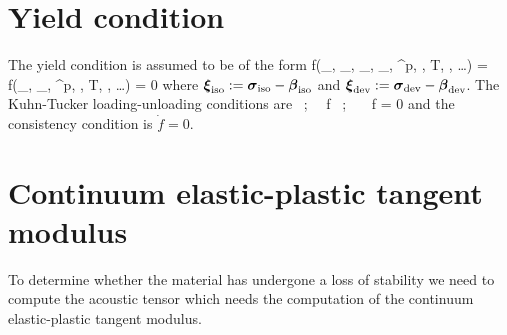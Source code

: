 \section{Yield condition}
The yield condition is assumed to be of the form
\Beq
  f(\Bsig_\Tiso, \Bsig_\Tdev, \Bbeta_\Tiso, \Bbeta_\Tdev, \Ve^p, \phi, T, \dot{\Ve}, \dots) 
    = f(\Bxi_\Tiso, \Bxi_\Tdev, \Ve^p, \phi, T, \dot{\Ve}, \dots) = 0
\Eeq
where $\boldsymbol{\xi}_{\text{iso}} := \boldsymbol{\sigma}_{\text{iso}} - \boldsymbol{\beta}_{\text{iso}}$ and $\boldsymbol{\xi}_{\text{dev}} := \boldsymbol{\sigma}_{\text{dev}} - \boldsymbol{\beta}_{\text{dev}}$.
The Kuhn-Tucker loading-unloading conditions are
\Beq
  \dot{\gamma}  ~;~~  f  ~;~~ \dot{\gamma}~f = 0
\Eeq
and the consistency condition is $\dot{f} = 0$.


\section{Continuum elastic-plastic tangent modulus}
To determine whether the material has undergone a loss of stability we need to compute
the acoustic tensor which needs the computation of the continuum elastic-plastic tangent
modulus.

